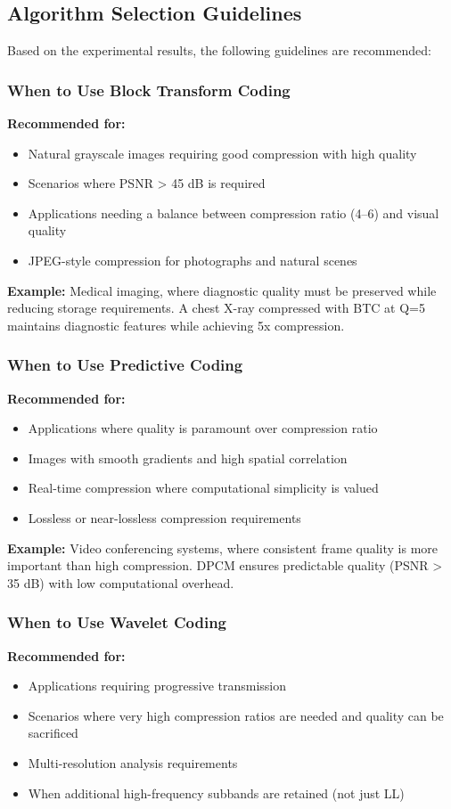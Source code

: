 \documentclass[12pt, a4paper]{AnantDocumentation}
\begin{document}
\subsection{Algorithm Selection Guidelines}
\label{subsec:algorithm-selection}
Based on the experimental results, the following guidelines are recommended:

\subsubsection{When to Use Block Transform Coding}
\textbf{Recommended for:}
\begin{itemize}
	\item Natural grayscale images requiring good compression with high quality
	\item Scenarios where PSNR > 45 dB is required
	\item Applications needing a balance between compression ratio (4--6) and visual quality
	\item JPEG-style compression for photographs and natural scenes
\end{itemize}

\textbf{Example:} Medical imaging, where diagnostic quality must be preserved while reducing storage requirements. A chest X-ray compressed with BTC at Q=5 maintains diagnostic features while achieving 5x compression.

\subsubsection{When to Use Predictive Coding}
\textbf{Recommended for:}
\begin{itemize}
	\item Applications where quality is paramount over compression ratio
	\item Images with smooth gradients and high spatial correlation
	\item Real-time compression where computational simplicity is valued
	\item Lossless or near-lossless compression requirements
\end{itemize}

\textbf{Example:} Video conferencing systems, where consistent frame quality is more important than high compression. DPCM ensures predictable quality (PSNR > 35 dB) with low computational overhead.

\subsubsection{When to Use Wavelet Coding}
\textbf{Recommended for:}
\begin{itemize}
	\item Applications requiring progressive transmission
	\item Scenarios where very high compression ratios are needed and quality can be sacrificed
	\item Multi-resolution analysis requirements
	\item When additional high-frequency subbands are retained (not just LL)
\end{itemize}
\end{document}
